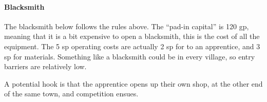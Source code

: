 \documentclass[twocolumn]{dndbook}
\begin{document}
\paragraph{Blacksmith}

The blacksmith below follows the rules above.
The ``pad-in capital'' is 120 gp, meaning that it is a bit expensive to open a blacksmith,
this is the cost of all the equipment.
The 5 sp operating costs are actually 2 sp for to an apprentice, and 3 sp for materials.
Something like a blacksmith could be in every village, so entry barriers are relatively low.\par

A potential hook is that the apprentice opens up their own shop, at the other end of the same town, and competition ensues.\par
\end{document}
